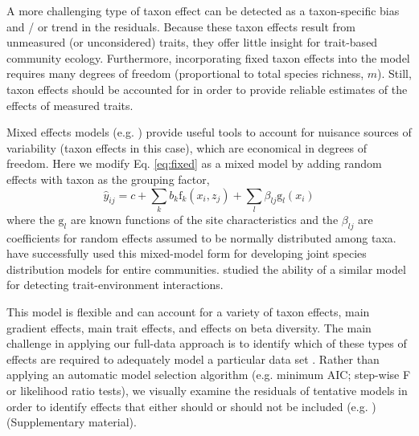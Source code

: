 \documentclass[12pt]{ecology}
\begin{document}
A more challenging type of taxon effect can be detected as a taxon-specific bias and / or trend in the residuals.  Because these taxon effects result from unmeasured (or unconsidered) traits, they offer little insight for trait-based community ecology.  Furthermore, incorporating fixed taxon effects into the model requires many degrees of freedom (proportional to total species richness, $m$).  Still, taxon effects should be accounted for in order to provide reliable estimates of the effects of measured traits.

Mixed effects models (e.g. ) provide useful tools to account for nuisance sources of variability (taxon effects in this case), which are economical in degrees of freedom.  Here we modify Eq. \ref{eq:fixed} as a mixed model by adding random effects with taxon as the grouping factor,
\begin{equation}
\hat{y}_{ij} = c + 
	\sum_k b_k \mathrm{f}_k (x_i, z_j) + 
	\sum_l \beta_{lj} \mathrm{g}_l (x_i)
\end{equation}
where the $\mathrm{g}_l$ are known functions of the site characteristics and the $\beta_{lj}$ are coefficients for random effects assumed to be normally distributed among taxa.  \citet{PollockEtAl2012} have successfully used this mixed-model form for developing joint species distribution models for entire communities.  \citet{JamilEtAl2012} studied the ability of a similar model for detecting trait-environment interactions.

This model is flexible and can account for a variety of taxon effects, main gradient effects, main trait effects, and effects on beta diversity.  The main challenge in applying our full-data approach is to identify which of these types of effects are required to adequately model a particular data set \citep{JamilEtAl2012}.  Rather than applying an automatic model selection algorithm (e.g. minimum AIC; step-wise F or likelihood ratio tests), we visually examine the residuals of tentative models in order to identify effects that either should or should not be included (e.g. ) (Supplementary material).
\end{document}
